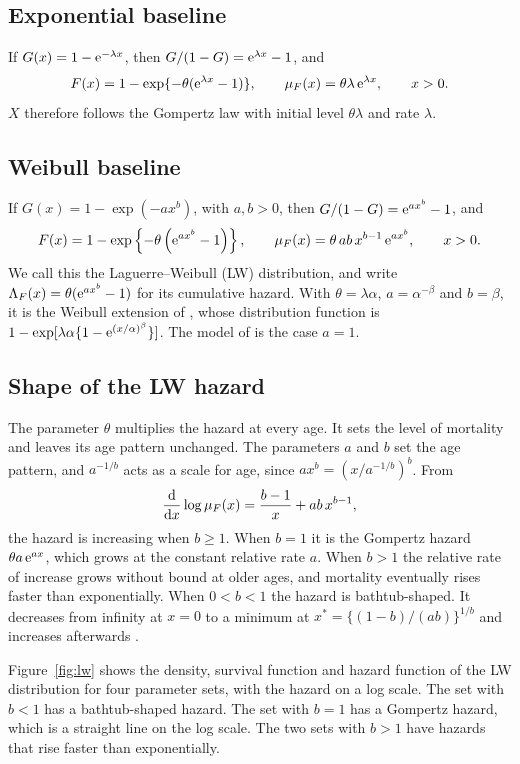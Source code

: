 \documentclass[12pt]{article}
\newcommand{\e}{{\rm e}}         %
\newcommand{\dd}{{\rm d}}        %
\begin{document}
\subsection{Exponential baseline}

If $G(x)=1-\e^{-\lambda x}$, then $G/(1-G)=\e^{\lambda x}-1$, and
\[
F(x)=1-\exp\{-\theta(\e^{\lambda x}-1)\},\qquad \mu_F(x)=\theta\lambda\,\e^{\lambda x},\qquad x>0.
\]
$X$ therefore follows the Gompertz law with initial level $\theta\lambda$ and rate $\lambda$.

\subsection{Weibull baseline}

If $G(x)=1-\exp(-ax^b)$, with $a,b>0$, then $G/(1-G)=\e^{ax^b}-1$, and
\begin{equation}\label{L-weibull}
F(x)=1- \exp\left\{-\theta\left(\e^{ax^b}-1\right)\right\},
\qquad
\mu_F(x)=\theta\,ab\,x^{b-1}\,\e^{ax^b}, \qquad x>0.
\end{equation}
We call this the Laguerre--Weibull (LW) distribution, and write $\Lambda_F(x)=\theta(\e^{ax^b}-1)$ for its cumulative hazard. With $\theta=\lambda\alpha$, $a=\alpha^{-\beta}$ and $b=\beta$, it is the Weibull extension of \citet{xie2002modified}, whose distribution function is $1-\exp[\lambda\alpha\{1-\e^{(x/\alpha)^\beta}\}]$. The model of \citet{chen2000new} is the case $a=1$.

\subsection{Shape of the LW hazard}

The parameter $\theta$ multiplies the hazard at every age. It sets the level of mortality and leaves its age pattern unchanged. The parameters $a$ and $b$ set the age pattern, and $a^{-1/b}$ acts as a scale for age, since $ax^b=(x/a^{-1/b})^b$. From
\[
\frac{\dd}{\dd x}\log\mu_F(x)=\frac{b-1}{x}+ab\,x^{b-1},
\]
the hazard is increasing when $b\geq1$. When $b=1$ it is the Gompertz hazard $\theta a\,\e^{ax}$, which grows at the constant relative rate $a$. When $b>1$ the relative rate of increase grows without bound at older ages, and mortality eventually rises faster than exponentially. When $0<b<1$ the hazard is bathtub-shaped. It decreases from infinity at $x=0$ to a minimum at $x^\ast=\{(1-b)/(ab)\}^{1/b}$ and increases afterwards \citep{xie2002modified}.

Figure~\ref{fig:lw} shows the density, survival function and hazard function of the LW distribution for four parameter sets, with the hazard on a log scale. The set with $b<1$ has a bathtub-shaped hazard. The set with $b=1$ has a Gompertz hazard, which is a straight line on the log scale. The two sets with $b>1$ have hazards that rise faster than exponentially.
\end{document}
